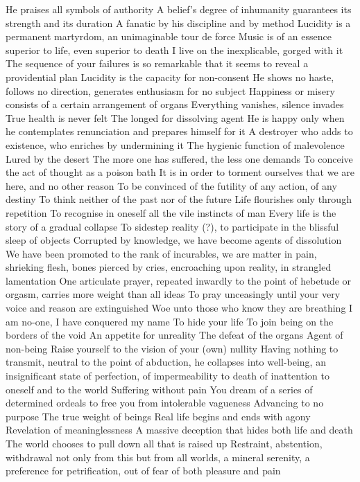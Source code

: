\documentclass{article}
\begin{document}
He praises all symbols of authority
A belief's degree of inhumanity guarantees its strength and its duration
A fanatic by his discipline and by method
Lucidity is a permanent martyrdom, an unimaginable tour de force
Music is of an essence superior to life, even superior to death
I live on the inexplicable, gorged with it
The sequence of your failures is so remarkable that it seems to reveal a providential plan
Lucidity is the capacity for non-consent
He shows no haste, follows no direction, generates enthusiasm for no subject
Happiness or misery consists of a certain arrangement of organs
Everything vanishes, silence invades
True health is never felt
The longed for dissolving agent
He is happy only when he contemplates renunciation and prepares himself for it
A destroyer who adds to existence, who enriches by undermining it
The hygienic function of malevolence
Lured by the desert
The more one has suffered, the less one demands
To conceive the act of thought as a poison bath
It is in order to torment ourselves that we are here, and no other reason
To be convinced of the futility of any action, of any destiny
To think neither of the past nor of the future
Life flourishes only through repetition
To recognise in oneself all the vile instincts of man
Every life is the story of a gradual collapse
To sidestep reality (?), to participate in the blissful sleep of objects
Corrupted by knowledge, we have become agents of dissolution
We have been promoted to the rank of incurables, we are matter in pain, shrieking flesh, bones pierced by cries, encroaching upon reality, in strangled lamentation
One articulate prayer, repeated inwardly to the point of hebetude or orgasm, carries more weight than all ideas
To pray unceasingly until your very voice and reason are extinguished
Woe unto those who know they are breathing
I am no-one, I have conquered my name
To hide your life
To join being on the borders of the void
An appetite for unreality
The defeat of the organs
Agent of non-being
Raise yourself to the vision of your (own) nullity
Having nothing to transmit, neutral to the point of abduction, he collapses into well-being, an insignificant state of perfection, of impermeability to death of inattention to oneself and to the world
Suffering without pain
You dream of a series of determined ordeals to free you from intolerable vagueness
Advancing to no purpose
The true weight of beings
Real life begins and ends with agony
Revelation of meaninglessness
A massive deception that hides both life and death
The world chooses to pull down all that is raised up
Restraint, abstention, withdrawal not only from this but from all worlds, a mineral serenity, a preference for petrification, out of fear of both pleasure and pain
\end{document}
